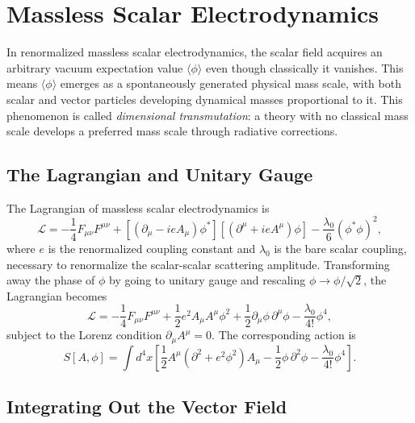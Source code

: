 \chapter{Massless Scalar Electrodynamics}
\label{ch:massless-scalar-ed}

In renormalized massless scalar electrodynamics, the scalar field acquires
an arbitrary vacuum expectation value $\langle\phi\rangle$ even though
classically it vanishes. This means $\langle\phi\rangle$ emerges as a
spontaneously generated physical mass scale, with both scalar and vector
particles developing dynamical masses proportional to it. This phenomenon
is called \emph{dimensional transmutation}: a theory with no classical
mass scale develops a preferred mass scale through radiative corrections.

\section{The Lagrangian and Unitary Gauge}

The Lagrangian of massless scalar electrodynamics is
\begin{equation}
	\mathcal{L} = -\frac{1}{4}F_{\mu\nu}F^{\mu\nu}
	+ \left[(\partial_\mu - ieA_\mu)\phi^*\right]
	\left[(\partial^\mu + ieA^\mu)\phi\right]
	- \frac{\lambda_0}{6}(\phi^*\phi)^2,
\end{equation}
where $e$ is the renormalized coupling constant and $\lambda_0$ is the
bare scalar coupling, necessary to renormalize the scalar-scalar
scattering amplitude. Transforming away the phase of $\phi$ by going to
unitary gauge and rescaling $\phi\to\phi/\sqrt{2}$, the Lagrangian
becomes
\begin{equation}
	\mathcal{L} = -\frac{1}{4}F_{\mu\nu}F^{\mu\nu}
	+ \frac{1}{2}e^2A_\mu A^\mu\phi^2
	+ \frac{1}{2}\partial_\mu\phi\,\partial^\mu\phi
	- \frac{\lambda_0}{4!}\phi^4,
\end{equation}
subject to the Lorenz condition $\partial_\mu A^\mu = 0$. The
corresponding action is
\begin{equation}
	S[A,\phi] = \int d^4x\left[\frac{1}{2}A^\mu
		(\partial^2 + e^2\phi^2)A_\mu
		- \frac{1}{2}\phi\,\partial^2\phi
		- \frac{\lambda_0}{4!}\phi^4\right].
\end{equation}

\section{Integrating Out the Vector Field}

